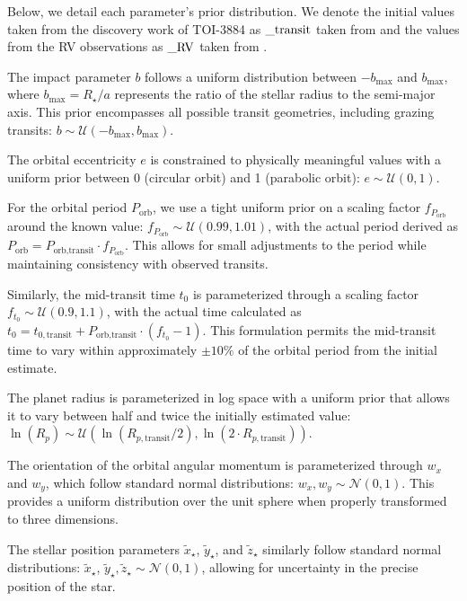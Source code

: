 \documentclass[twocolumn]{aastex631}
\begin{document}
Below, we detail each parameter's prior distribution. We denote the initial values taken from the discovery work of TOI-3884 as 
$\_\rm transit$ taken from \cite{Almenara2022} and the values from the RV observations as $\_\rm RV$ taken from \cite{Libby-Roberts2023}.

The impact parameter $b$ follows a uniform distribution between $-b_{\text{max}}$ and $b_{\text{max}}$, 
where $b_{\text{max}} = R_{\star}/a$ represents the ratio of the stellar radius to the semi-major axis. 
This prior encompasses all possible transit geometries, including grazing transits: $b \sim \mathcal{U}(-b_{\text{max}}, 
b_{\text{max}})$.

The orbital eccentricity $e$ is constrained to physically meaningful values with a uniform prior between 0 (circular orbit) and 1 (parabolic orbit): 
$e \sim \mathcal{U}(0, 1)$.

For the orbital period $P_{\text{orb}}$, we use a tight uniform prior on a scaling factor $f_{P_{\text{orb}}}$ around the known value: 
$f_{P_{\text{orb}}} \sim \mathcal{U}(0.99, 1.01)$, with the actual period derived as $P_{\text{orb}} = P_{\text{orb,transit}} \cdot f_{P_{\text{orb}}}$. 
This allows for small adjustments to the period while maintaining consistency with observed transits.

Similarly, the mid-transit time $t_0$ is parameterized through a scaling factor $f_{t_0} \sim \mathcal{U}(0.9, 1.1)$, 
with the actual time calculated as $t_0 = t_{0,\text{transit}} + P_{\text{orb,transit}} \cdot (f_{t_0} - 1)$. 
This formulation permits the mid-transit time to vary within approximately $\pm10\%$ of the orbital period from the initial estimate.

The planet radius is parameterized in log space with a uniform prior that allows it to vary between half and twice the 
initially estimated value: $\ln(R_p) \sim \mathcal{U}(\ln(R_{p,\text{transit}}/2), \ln(2 \cdot R_{p,\text{transit}}))$.

The orientation of the orbital angular momentum is parameterized through $w_x$ and $w_y$, which follow standard normal 
distributions: $w_x, w_y \sim \mathcal{N}(0, 1)$. 
This provides a uniform distribution over the unit sphere when properly transformed to three dimensions.

The stellar position parameters $\tilde{x}_{\star}$, $\tilde{y}_{\star}$, and $\tilde{z}_{\star}$ similarly follow standard normal 
distributions: $\tilde{x}_{\star}$, $\tilde{y}_{\star},\tilde{z}_{\star} \sim \mathcal{N}(0, 1)$, allowing for uncertainty in the precise position 
of the star.
\end{document}
